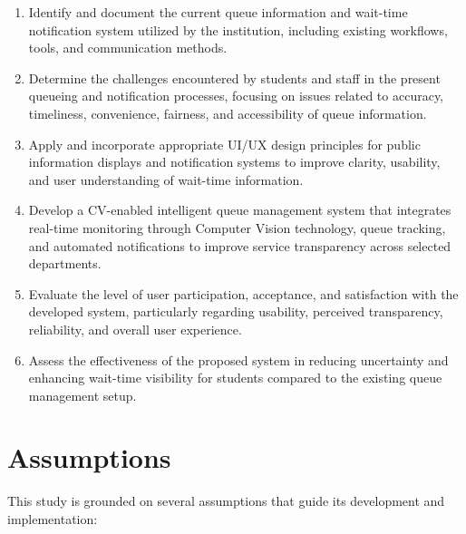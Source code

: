 \documentclass{research}
\begin{document}
\begin{enumerate}
    \item Identify and document the current queue information and wait-time notification system utilized by the institution, including existing workflows, tools, and communication methods.

    \item Determine the challenges encountered by students and staff in the present queueing and notification processes, focusing on issues related to accuracy, timeliness, convenience, fairness, and accessibility of queue information.

    \item Apply and incorporate appropriate UI/UX design principles for public information displays and notification systems to improve clarity, usability, and user understanding of wait-time information.

    \item Develop a CV-enabled intelligent queue management system that integrates real-time monitoring through Computer Vision technology, queue tracking, and automated notifications to improve service transparency across selected departments.

    \item Evaluate the level of user participation, acceptance, and satisfaction with the developed system, particularly regarding usability, perceived transparency, reliability, and overall user experience.

    \item Assess the effectiveness of the proposed system in reducing uncertainty and enhancing wait-time visibility for students compared to the existing queue management setup.
\end{enumerate}

\section{Assumptions}

This study is grounded on several assumptions that guide its development and implementation:
\end{document}
